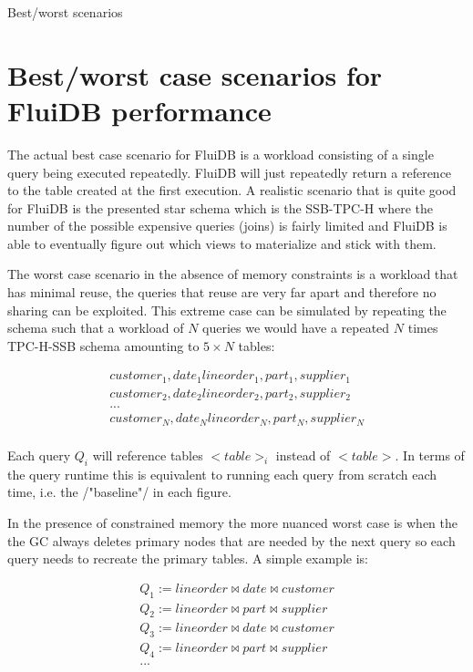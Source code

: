 \begin{corrected}{Best/worst scenarios}
  \section{Best/worst case scenarios for FluiDB performance}

  The actual best case scenario for FluiDB is a workload consisting of
  a single query being executed repeatedly. FluiDB will just repeatedly
  return a reference to the table created at the first execution. A
  realistic scenario that is quite good for FluiDB is the presented
  star schema which is the SSB-TPC-H where the number of the possible
  expensive queries (joins) is fairly limited and FluiDB is able to
  eventually figure out which views to materialize and stick with
  them.

  The worst case scenario in the absence of memory constraints is a
  workload that has minimal reuse, the queries that reuse are very far
  apart and therefore no sharing can be exploited. This extreme case
  can be simulated by repeating the schema such that a workload of
  \(N\) queries we would have a repeated \(N\) times TPC-H-SSB schema
  amounting to \(5 \times N\) tables:


  \begin{align*}
    customer_1, date_1 lineorder_1, part_1, supplier_1 \\
    customer_2, date_2 lineorder_2, part_2, supplier_2 \\
    ... \\
    customer_N, date_N lineorder_N, part_N, supplier_N \\
  \end{align*}

  Each query \(Q_i\) will reference tables \(<table>_i\) instead of
  \(<table>\). In terms of the query runtime this is equivalent to
  running each query from scratch each time, i.e. the /"baseline"/ in
  each figure.

  In the presence of constrained memory the more nuanced worst case is
  when the the GC always deletes primary nodes that are needed by the
  next query so each query needs to recreate the primary tables. A
  simple example is:


  \begin{align*}
    Q_1 := lineorder \Join date \Join customer \\
    Q_2 := lineorder \Join part \Join supplier \\
    Q_3 := lineorder \Join date \Join customer \\
    Q_4 := lineorder \Join part \Join supplier \\
    ...
  \end{align*}


\end{corrected}
